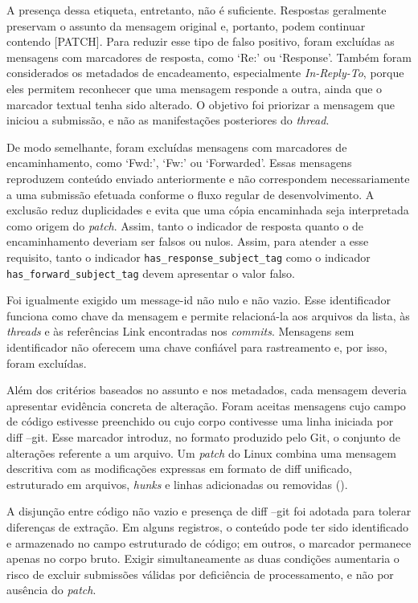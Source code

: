 A presença dessa etiqueta, entretanto, não é suficiente. Respostas geralmente preservam o assunto da mensagem original e, portanto, podem continuar contendo [PATCH]. Para reduzir esse tipo de falso positivo, foram excluídas as mensagens com marcadores de resposta, como ‘Re:’ ou ‘Response’. Também foram considerados os metadados de encadeamento, especialmente \textit{In-Reply-To}, porque eles permitem reconhecer que uma mensagem responde a outra, ainda que o marcador textual tenha sido alterado. O objetivo foi priorizar a mensagem que iniciou a submissão, e não as manifestações posteriores do \textit{thread}. 

De modo semelhante, foram excluídas mensagens com marcadores de encaminhamento, como ‘Fwd:’, ‘Fw:’ ou ‘Forwarded’. Essas mensagens reproduzem conteúdo enviado anteriormente e não correspondem necessariamente a uma submissão efetuada conforme o fluxo regular de desenvolvimento. A exclusão reduz duplicidades e evita que uma cópia encaminhada seja interpretada como origem do \textit{patch}. Assim, tanto o indicador de resposta quanto o de encaminhamento deveriam ser falsos ou nulos. Assim, para atender a esse requisito, tanto o indicador \texttt{has\_response\_subject\_tag} como o indicador \texttt{has\_forward\_subject\_tag} devem apresentar o valor falso. 

Foi igualmente exigido um message-id não nulo e não vazio. Esse identificador funciona como chave da mensagem e permite relacioná-la aos arquivos da lista, às \textit{threads} e às referências Link encontradas nos \textit{commits}. Mensagens sem identificador não oferecem uma chave confiável para rastreamento e, por isso, foram excluídas.

Além dos critérios baseados no assunto e nos metadados, cada mensagem deveria apresentar evidência concreta de alteração. Foram aceitas mensagens cujo campo de código estivesse preenchido ou cujo corpo contivesse uma linha iniciada por diff --git. Esse marcador introduz, no formato produzido pelo Git, o conjunto de alterações referente a um arquivo. Um \textit{patch} do Linux combina uma mensagem descritiva com as modificações expressas em formato de diff unificado, estruturado em arquivos, \textit{hunks} e linhas adicionadas ou removidas (\cite{hoang2021patchnet}).

A disjunção entre código não vazio e presença de diff --git foi adotada para tolerar diferenças de extração. Em alguns registros, o conteúdo pode ter sido identificado e armazenado no campo estruturado de código; em outros, o marcador permanece apenas no corpo bruto. Exigir simultaneamente as duas condições aumentaria o risco de excluir submissões válidas por deficiência de processamento, e não por ausência do \textit{patch}.

